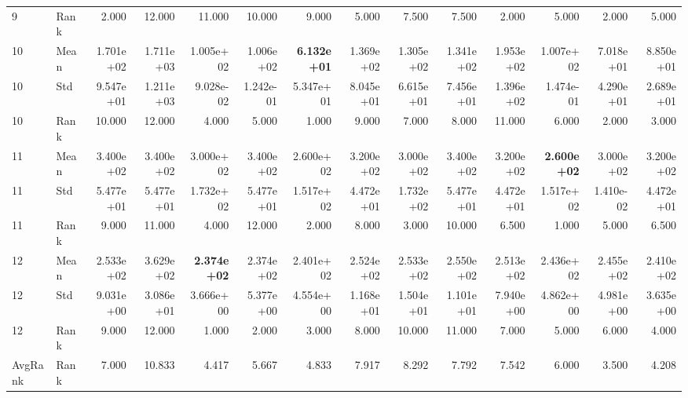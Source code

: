 \begin{table}[t]
\begin{tabular}{llrrrrrrrrrrrr}
9 & Rank & 2.000 & 12.000 & 11.000 & 10.000 & 9.000 & 5.000 & 7.500 & 7.500 & 2.000 & 5.000 & 2.000 & 5.000 \\
10 & Mean & 1.701e+02 & 1.711e+03 & 1.005e+02 & 1.006e+02 & \textbf{6.132e+01} & 1.369e+02 & 1.305e+02 & 1.341e+02 & 1.953e+02 & 1.007e+02 & 7.018e+01 & 8.850e+01 \\
10 & Std & 9.547e+01 & 1.211e+03 & 9.028e-02 & 1.242e-01 & 5.347e+01 & 8.045e+01 & 6.615e+01 & 7.456e+01 & 1.396e+02 & 1.474e-01 & 4.290e+01 & 2.689e+01 \\
10 & Rank & 10.000 & 12.000 & 4.000 & 5.000 & 1.000 & 9.000 & 7.000 & 8.000 & 11.000 & 6.000 & 2.000 & 3.000 \\
11 & Mean & 3.400e+02 & 3.400e+02 & 3.000e+02 & 3.400e+02 & 2.600e+02 & 3.200e+02 & 3.000e+02 & 3.400e+02 & 3.200e+02 & \textbf{2.600e+02} & 3.000e+02 & 3.200e+02 \\
11 & Std & 5.477e+01 & 5.477e+01 & 1.732e+02 & 5.477e+01 & 1.517e+02 & 4.472e+01 & 1.732e+02 & 5.477e+01 & 4.472e+01 & 1.517e+02 & 1.410e-02 & 4.472e+01 \\
11 & Rank & 9.000 & 11.000 & 4.000 & 12.000 & 2.000 & 8.000 & 3.000 & 10.000 & 6.500 & 1.000 & 5.000 & 6.500 \\
12 & Mean & 2.533e+02 & 3.629e+02 & \textbf{2.374e+02} & 2.374e+02 & 2.401e+02 & 2.524e+02 & 2.533e+02 & 2.550e+02 & 2.513e+02 & 2.436e+02 & 2.455e+02 & 2.410e+02 \\
12 & Std & 9.031e+00 & 3.086e+01 & 3.666e+00 & 5.377e+00 & 4.554e+00 & 1.168e+01 & 1.504e+01 & 1.101e+01 & 7.940e+00 & 4.862e+00 & 4.981e+00 & 3.635e+00 \\
12 & Rank & 9.000 & 12.000 & 1.000 & 2.000 & 3.000 & 8.000 & 10.000 & 11.000 & 7.000 & 5.000 & 6.000 & 4.000 \\
AvgRank & Rank & 7.000 & 10.833 & 4.417 & 5.667 & 4.833 & 7.917 & 8.292 & 7.792 & 7.542 & 6.000 & 3.500 & 4.208 \\
\hline
\end{tabular}
\end{table}
